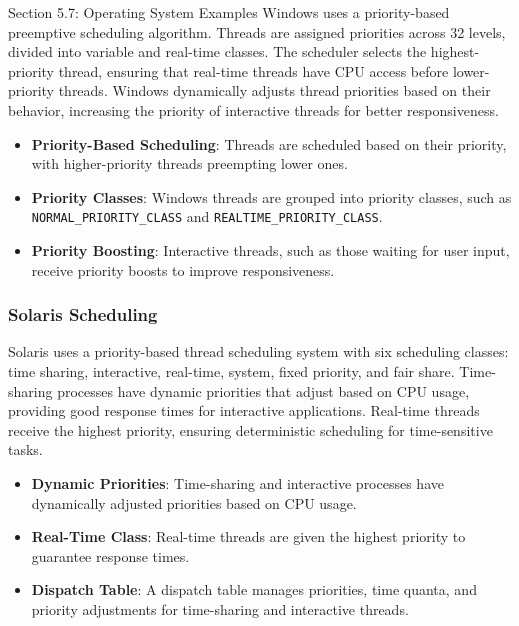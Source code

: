 \begin{notes}{Section 5.7: Operating System Examples}
    Windows uses a priority-based preemptive scheduling algorithm. Threads are assigned priorities across 32 levels, divided into variable and real-time classes. The scheduler selects the highest-priority 
    thread, ensuring that real-time threads have CPU access before lower-priority threads. Windows dynamically adjusts thread priorities based on their behavior, increasing the priority of interactive 
    threads for better responsiveness.
    
    \begin{highlight}
    
        \begin{itemize}
            \item \textbf{Priority-Based Scheduling}: Threads are scheduled based on their priority, with higher-priority threads preempting lower ones.
            \item \textbf{Priority Classes}: Windows threads are grouped into priority classes, such as \texttt{NORMAL\_PRIORITY\_CLASS} and \texttt{REALTIME\_PRIORITY\_CLASS}.
            \item \textbf{Priority Boosting}: Interactive threads, such as those waiting for user input, receive priority boosts to improve responsiveness.
        \end{itemize}
    
    \end{highlight}
    
    \subsubsection*{Solaris Scheduling}
    
    Solaris uses a priority-based thread scheduling system with six scheduling classes: time sharing, interactive, real-time, system, fixed priority, and fair share. Time-sharing processes have dynamic priorities 
    that adjust based on CPU usage, providing good response times for interactive applications. Real-time threads receive the highest priority, ensuring deterministic scheduling for time-sensitive tasks.
    
    \begin{highlight}
    
        \begin{itemize}
            \item \textbf{Dynamic Priorities}: Time-sharing and interactive processes have dynamically adjusted priorities based on CPU usage.
            \item \textbf{Real-Time Class}: Real-time threads are given the highest priority to guarantee response times.
            \item \textbf{Dispatch Table}: A dispatch table manages priorities, time quanta, and priority adjustments for time-sharing and interactive threads.
        \end{itemize}
    

\end{highlight}
\end{notes}
